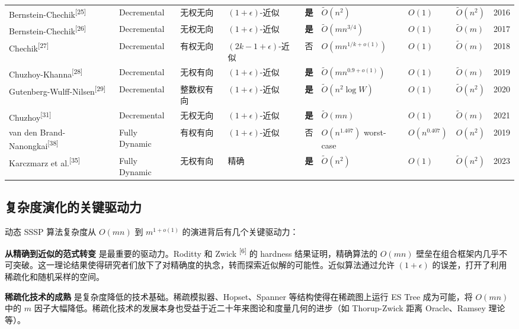 \documentclass[12pt,a4paper]{ctexart}
\begin{document}
\begin{landscape}
\begin{table}[H]
\begin{tabular}{|p{2.7cm}|p{2.2cm}|p{1.8cm}|p{2.0cm}|p{0.9cm}|p{6.0cm}|p{1.4cm}|p{2.0cm}|p{0.9cm}|}
Bernstein-Chechik\textsuperscript{[25]} & Decremental & 无权无向 & $(1+\epsilon)$-近似 & \textbf{是} & $\tilde{O}(n^2)$ & $O(1)$ & $\tilde{O}(n^2)$ & 2016 \\
Bernstein-Chechik\textsuperscript{[26]} & Decremental & 无权无向 & $(1+\epsilon)$-近似 & \textbf{是} & $\tilde{O}(mn^{3/4})$ & $O(1)$ & $\tilde{O}(m)$ & 2017 \\
Chechik\textsuperscript{[27]} & Decremental & 有权无向 & $(2k-1+\epsilon)$-近似 & 否 & $O(mn^{1/k+o(1)})$ & $O(1)$ & $\tilde{O}(m)$ & 2018 \\
Chuzhoy-Khanna\textsuperscript{[28]} & Decremental & 无权有向 & $(1+\epsilon)$-近似 & \textbf{是} & $\tilde{O}(mn^{0.9+o(1)})$ & $O(1)$ & $\tilde{O}(m)$ & 2019 \\
Gutenberg-Wulff-Nilsen\textsuperscript{[29]} & Decremental & 整数权有向 & $(1+\epsilon)$-近似 & \textbf{是} & $\tilde{O}(n^2\log W)$ & $O(1)$ & $\tilde{O}(n^2)$ & 2020 \\
Chuzhoy\textsuperscript{[31]} & Decremental & 无权无向 & $(1+\epsilon)$-近似 & \textbf{是} & $\tilde{O}(mn)$ & $O(1)$ & $\tilde{O}(m)$ & 2021 \\
van den Brand-Nanongkai\textsuperscript{[38]} & Fully Dynamic & 有权有向 & $(1+\epsilon)$-近似 & 否 & $O(n^{1.407})$ worst-case & $O(n^{0.407})$ & $O(n^2)$ & 2019 \\
Karczmarz et al.\textsuperscript{[35]} & Fully Dynamic & 无权有向 & 精确 & \textbf{是} & $\tilde{O}(n^2)$ & $O(1)$ & $\tilde{O}(n^2)$ & 2023 \\
\bottomrule
\end{tabular}
\end{table}
\end{landscape}

\subsection{复杂度演化的关键驱动力}

动态 SSSP 算法复杂度从 $O(mn)$ 到 $m^{1+o(1)}$ 的演进背后有几个关键驱动力：

\textbf{从精确到近似的范式转变} 是最重要的驱动力。Roditty 和 Zwick \textsuperscript{[6]}  的 hardness 结果证明，精确算法的 $O(mn)$ 壁垒在组合框架内几乎不可突破。这一理论结果使得研究者们放下了对精确度的执念，转而探索近似解的可能性。近似算法通过允许 $(1+\epsilon)$ 的误差，打开了利用稀疏化和随机采样的空间。

\textbf{稀疏化技术的成熟} 是复杂度降低的技术基础。稀疏模拟器、Hopset、Spanner 等结构使得在稀疏图上运行 ES Tree 成为可能，将 $O(mn)$ 中的 $m$ 因子大幅降低。稀疏化技术的发展本身也受益于近二十年来图论和度量几何的进步（如 Thorup-Zwick 距离 Oracle、Ramsey 理论等）。
\end{document}
